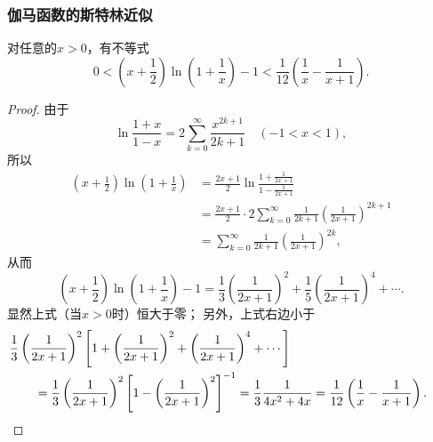 \subsubsection{伽马函数的斯特林近似}
\begin{lemma}\label{theorem:定积分.伽马函数的斯特灵近似.引理1}
对任意的\(x>0\)，有不等式\begin{equation}\label{equation:定积分.伽马函数的斯特灵近似.引理1}
0 < \left(x+\frac{1}{2}\right) \ln(1+\frac{1}{x}) - 1
< \frac{1}{12}\left(\frac{1}{x}-\frac{1}{x+1}\right).
\end{equation}
\begin{proof}
由于\[
	\ln\frac{1+x}{1-x}
	= 2 \sum_{k=0}^\infty \frac{x^{2k+1}}{2k+1}
	\quad(-1<x<1),
\]
所以\begin{align*}
	\left(x+\frac{1}{2}\right) \ln(1+\frac{1}{x})
	&= \frac{2x+1}{2} \ln\frac{
		1+\frac{1}{2x+1}
	}{
		1-\frac{1}{2x+1}
	} \\
	&= \frac{2x+1}{2} \cdot
	2 \sum_{k=0}^\infty \frac{1}{2k+1} \left(\frac{1}{2x+1}\right)^{2k+1} \\
	&= \sum_{k=0}^\infty \frac{1}{2k+1} \left(\frac{1}{2x+1}\right)^{2k},
\end{align*}
从而\[
	\left(x+\frac{1}{2}\right) \ln(1+\frac{1}{x}) - 1
	= \frac{1}{3} \left(\frac{1}{2x+1}\right)^2
	+ \frac{1}{5} \left(\frac{1}{2x+1}\right)^4
	+ \dotsb.
\]
显然上式（当\(x>0\)时）恒大于零；
另外，上式右边小于\begin{align*}
	&\hspace{-20pt}
	\frac{1}{3} \left(\frac{1}{2x+1}\right)^2 \left[
	1 + \left(\frac{1}{2x+1}\right)^2 + \left(\frac{1}{2x+1}\right)^4 + \dotsb
	\right] \\
	&= \frac{1}{3} \left(\frac{1}{2x+1}\right)^2 \left[
	1 - \left(\frac{1}{2x+1}\right)^2
	\right]^{-1}
	= \frac{1}{3} \frac{1}{4x^2 + 4x}
	= \frac{1}{12} \left(\frac{1}{x} - \frac{1}{x+1}\right).
	\qedhere
\end{align*}
\end{proof}
\end{lemma}

